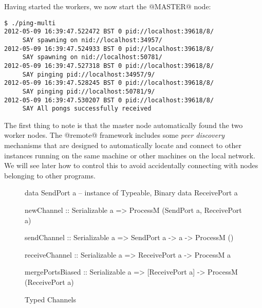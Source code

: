 Having started the workers, we now start the @MASTER@ node:

\begin{verbatim}
$ ./ping-multi
2012-05-09 16:39:47.522472 BST 0 pid://localhost:39618/8/
     SAY spawning on nid://localhost:34957/
2012-05-09 16:39:47.524933 BST 0 pid://localhost:39618/8/
     SAY spawning on nid://localhost:50781/
2012-05-09 16:39:47.527318 BST 0 pid://localhost:39618/8/
     SAY pinging pid://localhost:34957/9/
2012-05-09 16:39:47.528245 BST 0 pid://localhost:39618/8/
     SAY pinging pid://localhost:50781/9/
2012-05-09 16:39:47.530207 BST 0 pid://localhost:39618/8/
     SAY All pongs successfully received
\end{verbatim}

The first thing to note is that the master node automatically found
the two worker nodes.  The @remote@ framework includes some \emph{peer
  discovery} mechanisms that are designed to automatically locate and
connect to other instances running on the same machine or other
machines on the local network.  We will see later how to control this
to avoid accidentally connecting with nodes belonging to other
programs.





\ToDo{}

\begin{figure}
\begin{haskell}
data SendPort a     -- instance of Typeable, Binary
data ReceivePort a

newChannel       :: Serializable a
                 => ProcessM (SendPort a, ReceivePort a)

sendChannel      :: Serializable a
                 => SendPort a -> a -> ProcessM ()

receiveChannel   :: Serializable a
                 => ReceivePort a -> ProcessM a

mergePortsBiased :: Serializable a
                 => [ReceivePort a] -> ProcessM (ReceivePort a)
\end{haskell}
\label{fig:remote-typed-channels}
\caption{Typed Channels}
\end{figure}

%
%

